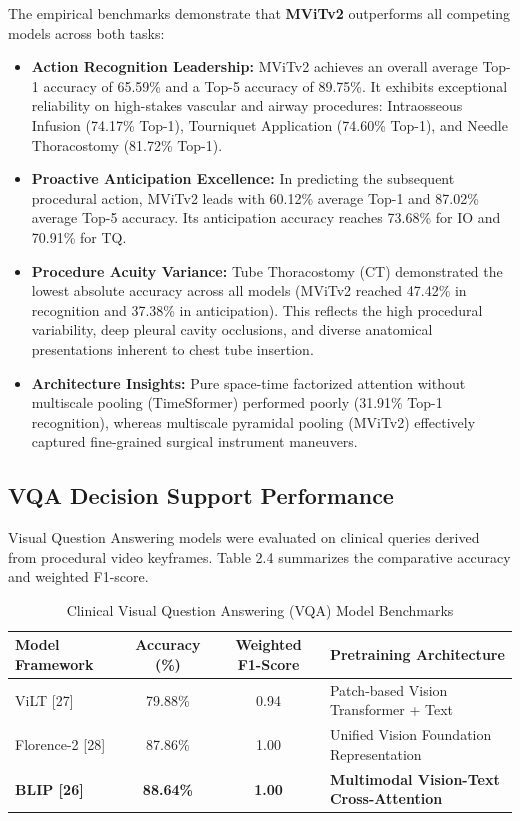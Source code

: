\documentclass[12pt,a4paper]{report}
\begin{document}
The empirical benchmarks demonstrate that \textbf{MViTv2} outperforms all competing models across both tasks:
\begin{itemize}
    \item \textbf{Action Recognition Leadership:} MViTv2 achieves an overall average Top-1 accuracy of 65.59\% and a Top-5 accuracy of 89.75\%. It exhibits exceptional reliability on high-stakes vascular and airway procedures: Intraosseous Infusion (74.17\% Top-1), Tourniquet Application (74.60\% Top-1), and Needle Thoracostomy (81.72\% Top-1).
    \item \textbf{Proactive Anticipation Excellence:} In predicting the subsequent procedural action, MViTv2 leads with 60.12\% average Top-1 and 87.02\% average Top-5 accuracy. Its anticipation accuracy reaches 73.68\% for IO and 70.91\% for TQ.
    \item \textbf{Procedure Acuity Variance:} Tube Thoracostomy (CT) demonstrated the lowest absolute accuracy across all models (MViTv2 reached 47.42\% in recognition and 37.38\% in anticipation). This reflects the high procedural variability, deep pleural cavity occlusions, and diverse anatomical presentations inherent to chest tube insertion.
    \item \textbf{Architecture Insights:} Pure space-time factorized attention without multiscale pooling (TimeSformer) performed poorly (31.91\% Top-1 recognition), whereas multiscale pyramidal pooling (MViTv2) effectively captured fine-grained surgical instrument maneuvers.
\end{itemize}

\subsection{VQA Decision Support Performance}
Visual Question Answering models were evaluated on clinical queries derived from procedural video keyframes. Table 2.4 summarizes the comparative accuracy and weighted F1-score.

\begin{table}[htbp]
\centering
\caption{Clinical Visual Question Answering (VQA) Model Benchmarks}
\label{tab:vqa_benchmark}
\small
\begin{tabularx}{0.85\textwidth}{@{}l c c X@{}}
\toprule
\textbf{Model Framework} & \textbf{Accuracy (\%)} & \textbf{Weighted F1-Score} & \textbf{Pretraining Architecture} \\
\midrule
ViLT [27] & 79.88\% & 0.94 & Patch-based Vision Transformer + Text \\
Florence-2 [28] & 87.86\% & 1.00 & Unified Vision Foundation Representation \\
\textbf{BLIP [26]} & \textbf{88.64\%} & \textbf{1.00} & \textbf{Multimodal Vision-Text Cross-Attention} \\
\bottomrule
\end{tabularx}
\end{table}
\end{document}
